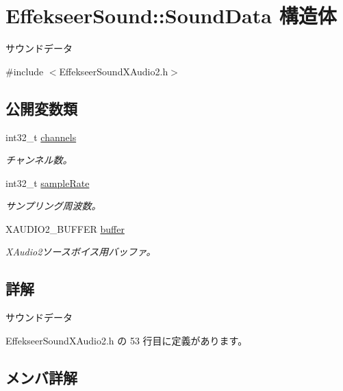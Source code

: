 \hypertarget{struct_effekseer_sound_1_1_sound_data}{}\section{Effekseer\+Sound\+:\+:Sound\+Data 構造体}
\label{struct_effekseer_sound_1_1_sound_data}


サウンドデータ  




{\ttfamily \#include $<$Effekseer\+Sound\+X\+Audio2.\+h$>$}

\subsection*{公開変数類}
\begin{DoxyCompactItemize}
\item 
int32\+\_\+t \mbox{\hyperlink{struct_effekseer_sound_1_1_sound_data_a6ce06a2fb5016cc2664b525ace949423}{channels}}
\begin{DoxyCompactList}\small\item\em チャンネル数。 \end{DoxyCompactList}\item 
int32\+\_\+t \mbox{\hyperlink{struct_effekseer_sound_1_1_sound_data_a32d83df2626bbfbeafa1f6ebe72d9516}{sample\+Rate}}
\begin{DoxyCompactList}\small\item\em サンプリング周波数。 \end{DoxyCompactList}\item 
X\+A\+U\+D\+I\+O2\+\_\+\+B\+U\+F\+F\+ER \mbox{\hyperlink{struct_effekseer_sound_1_1_sound_data_ac63c1bb266d48dcb88facd2dbb1b15cb}{buffer}}
\begin{DoxyCompactList}\small\item\em X\+Audio2ソースボイス用バッファ。 \end{DoxyCompactList}\end{DoxyCompactItemize}


\subsection{詳解}
サウンドデータ 

 Effekseer\+Sound\+X\+Audio2.\+h の 53 行目に定義があります。



\subsection{メンバ詳解}
\mbox{\label{struct_effekseer_sound_1_1_sound_data_ac63c1bb266d48dcb88facd2dbb1b15cb}} 
